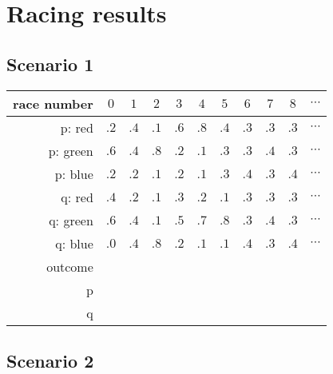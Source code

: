 \documentclass[14pt]{extarticle} %
\begin{document}
\section*{Racing results}

\subsection*{Scenario 1}

 \begin{tabular}{r|c|c|c|c|c|c|c|c|c|c}
      race number  & $0$ & $1$ & $2$ & $3$ & $4$ & $5$ & $6$ & $7$  & $8$ &$\cdots$
      \\ \hline 
      p: red & $.2$ & $.4$ & $.1$ & $.6$ & $.8$ & $.4$ & $.3$ & $.3$  & $.3$
      &$\cdots$ \\ 
      p: green & $.6$ & $.4$ & $.8$ & $.2$ & $.1$ & $.3$ & $.3$ & $.4$  & $.3$
      &$\cdots$ \\ 
      p: blue & $.2$ & $.2$ & $.1$ & $.2$ & $.1$ & $.3$ & $.4$ & $.3$  & $.4$
      &$\cdots$ \\ \hline
      q: red & $.4$ & $.2$ & $.1$ & $.3$ & $.2$ & $.1$ & $.3$ & $.3$  & $.3$
      &$\cdots$ \\ 
      q: green & $.6$ & $.4$ & $.1$ & $.5$ & $.7$ & $.8$ & $.3$ & $.4$  & $.3$
      &$\cdots$ \\ 
      q: blue & $.0$ & $.4$ & $.8$ & $.2$ & $.1$ & $.1$ & $.4$ & $.3$  & $.4$
      &$\cdots$ \\ \hline \hline
      outcome & & & & & & & & & & \\ \hline\hline
      p & & & & & & & & & & \\ \hline
      q & & & & & & & & & & \\ \hline

    \end{tabular}

\newpage
\subsection*{Scenario 2}
\end{document}
